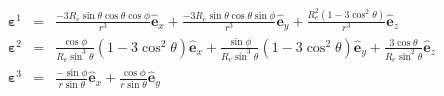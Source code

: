 \documentclass[11pt,letterpaper]{article}
\begin{document}
\begin{eqnarray}
\boldsymbol{\varepsilon}^1 &=& \frac{-3 R_e \sin \theta \cos \theta \cos \phi}{r^3} \hat{\mathbf{e}}_x + \frac{-3 R_e \sin \theta \cos \theta \sin \phi}{r^3} \hat{\mathbf{e}}_y + \frac{R_e^2 \left( 1 - 3 \cos^2 \theta \right)}{r^3} \hat{\mathbf{e}}_z \\
\boldsymbol{\varepsilon}^2 &=& \frac{\cos \phi}{ R_e \sin^3 \theta} \left( 1 - 3 \cos^2 \theta \right) \hat{\mathbf{e}}_x +  \frac{\sin \phi}{ R_e \sin^3 \theta} \left( 1 - 3 \cos^2 \theta \right) \hat{\mathbf{e}}_y + \frac{3 \cos \theta}{R_e \sin^2 \theta} \hat{\mathbf{e}}_z \\
\boldsymbol{\varepsilon}^3 &=& \frac{- \sin \phi}{r \sin \theta} \hat{\mathbf{e}}_x + \frac{\cos \phi}{r \sin \theta} \hat{\mathbf{e}}_y
\end{eqnarray}
\end{document}
